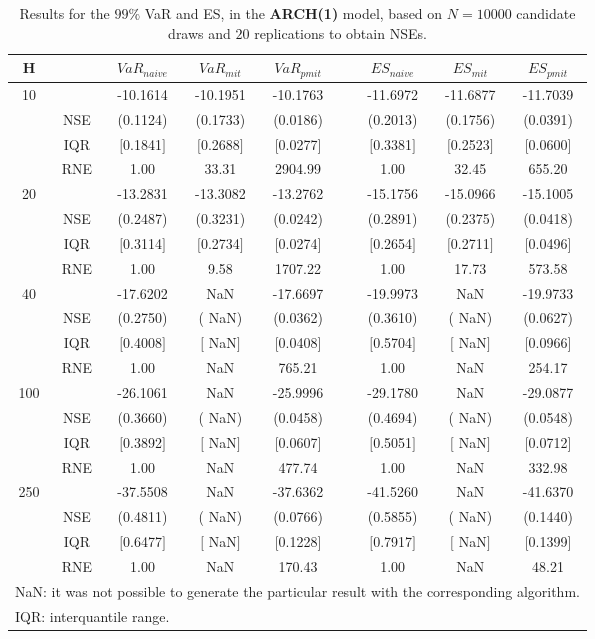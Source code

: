 \footnotesize{  
{ \renewcommand{\arraystretch}{1.3} 
\begin{longtable}{ccccccccc}  
\caption{Results for the $99\%$ VaR and ES, in the \textbf{ARCH(1)} model, based on $N=10000$ candidate draws and $20$ replications to obtain NSEs.} 
\label{tab:res_algos_arch_ML} \\ 
 H & & $VaR_{naive}$ & $VaR_{mit}$ & $VaR_{pmit}$ &  & $ES_{naive}$ & $ES_{mit}$ & $ES_{pmit}$ \\ \hline 
10 & & -10.1614 & -10.1951 & -10.1763 & & -11.6972 & -11.6877 & -11.7039  \\ 
  & NSE & (0.1124) & (0.1733) & (0.0186) & & (0.2013) & (0.1756) & (0.0391)   \\ 
 & IQR & $[$0.1841$]$ & $[$0.2688$]$ & $[$0.0277$]$ & & $[$0.3381$]$ & $[$0.2523$]$ & $[$0.0600$]$  \\  
  & RNE &   1.00 &  33.31 & 2904.99 & &   1.00 &  32.45 & 655.20   \\ [1ex] 
20 & & -13.2831 & -13.3082 & -13.2762 & & -15.1756 & -15.0966 & -15.1005  \\ 
  & NSE & (0.2487) & (0.3231) & (0.0242) & & (0.2891) & (0.2375) & (0.0418)   \\ 
 & IQR & $[$0.3114$]$ & $[$0.2734$]$ & $[$0.0274$]$ & & $[$0.2654$]$ & $[$0.2711$]$ & $[$0.0496$]$  \\  
  & RNE &   1.00 &   9.58 & 1707.22 & &   1.00 &  17.73 & 573.58   \\ [1ex] 
40 & & -17.6202 &    NaN & -17.6697 & & -19.9973 &    NaN & -19.9733  \\ 
  & NSE & (0.2750) & (   NaN) & (0.0362) & & (0.3610) & (   NaN) & (0.0627)   \\ 
 & IQR & $[$0.4008$]$ & $[$   NaN$]$ & $[$0.0408$]$ & & $[$0.5704$]$ & $[$   NaN$]$ & $[$0.0966$]$  \\  
  & RNE &   1.00 &    NaN & 765.21 & &   1.00 &    NaN & 254.17   \\ [1ex] 
100 & & -26.1061 &    NaN & -25.9996 & & -29.1780 &    NaN & -29.0877  \\ 
  & NSE & (0.3660) & (   NaN) & (0.0458) & & (0.4694) & (   NaN) & (0.0548)   \\ 
 & IQR & $[$0.3892$]$ & $[$   NaN$]$ & $[$0.0607$]$ & & $[$0.5051$]$ & $[$   NaN$]$ & $[$0.0712$]$  \\  
  & RNE &   1.00 &    NaN & 477.74 & &   1.00 &    NaN & 332.98   \\ [1ex] 
250 & & -37.5508 &    NaN & -37.6362 & & -41.5260 &    NaN & -41.6370  \\ 
  & NSE & (0.4811) & (   NaN) & (0.0766) & & (0.5855) & (   NaN) & (0.1440)   \\ 
 & IQR & $[$0.6477$]$ & $[$   NaN$]$ & $[$0.1228$]$ & & $[$0.7917$]$ & $[$   NaN$]$ & $[$0.1399$]$  \\  
  & RNE &   1.00 &    NaN & 170.43 & &   1.00 &    NaN &  48.21   \\ [1ex] 
\hline 
  \multicolumn{9}{l}{\footnotesize{NaN: it was not possible to generate the particular result with the corresponding algorithm.}} \\ 
  \multicolumn{9}{l}{\footnotesize{IQR: interquantile range.}} \\ 
\end{longtable} 
} 
} 
